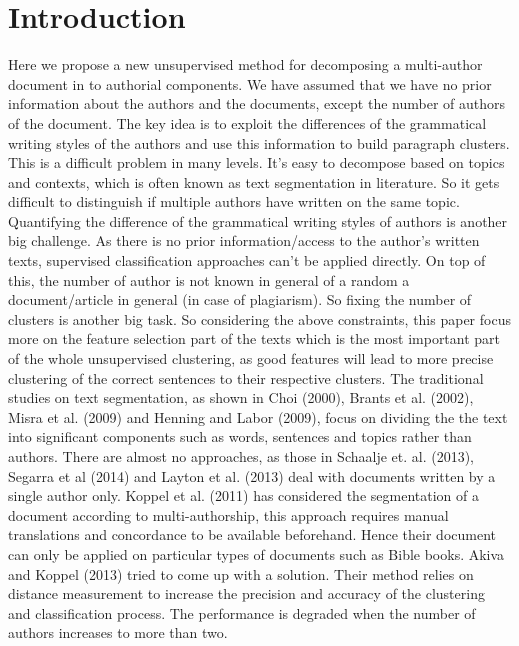 \documentclass[letterpaper]{article}
\begin{document}
\section{Introduction}
\noindent Here we propose a new unsupervised method for decomposing a multi-author document in to authorial components. We have assumed that we have no prior information about the authors and the documents, except the number of authors of the document. The key idea is to exploit the differences of the grammatical writing styles of the authors and use this information to build paragraph clusters. This is a difficult problem in many levels. It’s easy to decompose based on topics and contexts, which is often known as text segmentation in literature. So it gets difficult to distinguish if multiple authors have written on the same topic. Quantifying the difference of the grammatical writing styles of authors is another big challenge. As there is no prior information/access to the author’s written texts, supervised classification approaches can’t be applied directly. On top of this, the number of author is not known in general of a random a document/article in general (in case of plagiarism). So fixing the number of clusters is another big task. So considering the above constraints, this paper focus more on the feature selection part of the texts which is the most important part of the whole unsupervised clustering, as good features will lead to more precise clustering of the correct sentences to their respective clusters.
The traditional studies on text segmentation, as shown in Choi (2000), Brants et al. (2002), Misra et al. (2009) and Henning and Labor (2009), focus on dividing the the text into significant components such as words, sentences and topics rather than authors. There are almost no approaches, as those in Schaalje et. al. (2013), Segarra et al (2014) and Layton et al. (2013) deal with documents written by a single author only. Koppel et al. (2011) has considered the segmentation of a document according to multi-authorship, this approach requires manual translations and concordance to be available beforehand. Hence their document can only be applied on particular types of documents such as Bible books. Akiva and Koppel (2013) tried to come up with a solution. Their method relies on distance measurement to increase the precision and accuracy of the clustering and classification process. The performance is degraded when the number of authors increases to more than two.
\end{document}
